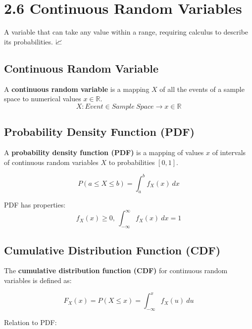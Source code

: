 \documentclass[
  letterpaper,
  DIV=11,
  numbers=noendperiod]{scrreprt}
\begin{document}
\chapter{2.6 Continuous Random
Variables}\label{continuous-random-variables}

\begin{tcolorbox}[enhanced jigsaw, colback=white, left=2mm, breakable, opacityback=0, bottomrule=.15mm, rightrule=.15mm, arc=.35mm, colframe=quarto-callout-note-color-frame, leftrule=.75mm, toprule=.15mm]

A variable that can take any value within a range, requiring calculus to
describe its probabilities. 📈

\end{tcolorbox}

\section{Continuous Random Variable}\label{continuous-random-variable}

A \textbf{continuous random variable} is a mapping \(X\) of all the
events of a sample space to numerical values \(x \in \mathbb{R}\). \[ 
X: Event \in Sample \ Space \to x \in \mathbb{R} 
\]

\section{Probability Density Function
(PDF)}\label{probability-density-function-pdf}

A \textbf{probability density function (PDF)} is a mapping of values
\(x\) of intervals of continuous random variables \(X\) to probabilities
\([0,1]\).

\[ 
P(a \leq X \leq b) = \int_{a}^{b} f_{X}(x) \ dx 
\]

PDF has properties: \[
f_{X}(x) \geq 0, \ \int_{-\infty}^{\infty} f_{X}(x) \ dx = 1
\]

\section{Cumulative Distribution Function
(CDF)}\label{cumulative-distribution-function-cdf-1}

The \textbf{cumulative distribution function (CDF)} for continuous
random variables is defined as:

\[ F_{X}(x) = P(X \leq x) = \int_{-\infty}^{x} f_{X}(u) \ du \]

Relation to PDF:
\end{document}
